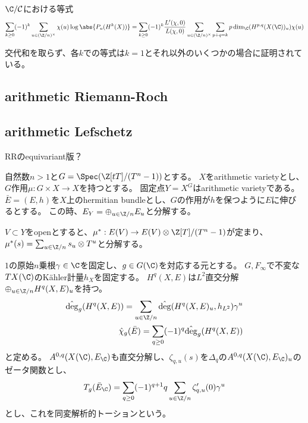 \documentclass[uplatex, a4paper]{jsbook}
\begin{document}
\begin{thm}[Theoreme 4.4]
$\C/\mathcal{C}$における等式
\begin{align*}
\sum_{k\geq0}(-1)^k\sum_{u\in(\Z/n)^\times}\chi(u)\log\abs{P_u(H^k(X))}
=\sum_{k\geq0}(-1)^k\frac{L'(\chi,0)}{L(\chi,0)}\sum_{u\in(\Z/n)^\times}\sum_{p+q=k}p\dim_\C(H^{p,q}(X(\C))_u)\chi(u)
\end{align*}
\end{thm}

交代和を取らず、各$k$での等式は$k=1$とそれ以外のいくつかの場合に証明されている。

\subsection{arithmetic Riemann-Roch}

\subsection{arithmetic Lefschetz}
RRのequivariant版？

自然数$n>1$と$G=\Spec(\Z[tT]/(T^n-1))$とする。
$X$をarithmetic varietyとし、$G$作用$\mu:G \times X \to X$を持つとする。
固定点$Y=X^G$はarithmetic varietyである。
$\bar{E}=(E,h)$を$X$上のhermitian bundleとし、$G$の作用が$h$を保つように$E$に伸びるとする。
この時、$E_Y=\oplus_{u\in\Z/n}E_u$と分解する。

$V\subset Y$をopenとすると、$\mu^*:E(V) \to E(V) \otimes \Z[T]/(T^n-1)$が定まり、
$\mu^*(s)=\sum_{u\in \Z/n}s_u\otimes T^u$と分解する。

$1$の原始$n$乗根$\gamma\in\C$を固定し、$g\in G(\C)$を対応する元とする。
$G, F_\infty$で不変な$TX(\C)$のK\"ahler計量$h_X$を固定する。
$H^q(X,E)$は$L^2$直交分解$\oplus_{u\in\Z/n}H^q(X,E)_u$を持つ。
\begin{align*}
\hat{\deg}_g(H^q(X,E))=\sum_{u\in\Z/n}\hat{\deg}(H^q(X,E)_u,h_{L^2})\gamma^u\\
\hat{\chi}_g(\bar{E})=\sum_{q\geq0}(-1)^q\hat{\deg}_g(H^q(X,E))
\end{align*}
と定める。
$A^{0,q}(X(\C),E_\C)$も直交分解し、$\zeta_{q,u}(s)$を$\Delta_q$の$A^{0,q}(X(\C),E_\C)_u$のゼータ関数とし、
\begin{align*}
T_g(\bar{E}_\C)=\sum_{q\geq0}(-1)^{q+1}q\sum_{u\in\Z/n}\zeta'_{q,u}(0)\gamma^u
\end{align*}
とし、これを同変解析的トーションという。
\end{document}
